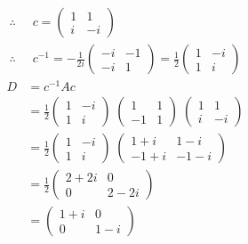 \documentclass[../main-sheet.tex]{subfiles}
\begin{document}
\begin{soln}
    \begin{align*}
        \therefore\;\;& c=\begin{pmatrix}
            1 & 1\\
            i & -i
        \end{pmatrix}\\
        \therefore\;\;& c^{-1}=-\frac{1}{2i}\begin{pmatrix}
            -i & -1\\
            -i & 1
        \end{pmatrix}=\frac{1}{2}\begin{pmatrix}
            1 & -i\\
            1 & i
        \end{pmatrix}
    \end{align*}
    \begin{align*}
        D&=c^{-1}Ac\\
        &=\frac{1}{2}\begin{pmatrix}
            1 & -i\\
            1 & i
        \end{pmatrix}\;\begin{pmatrix}
            1 & 1\\
            -1 & 1
        \end{pmatrix}\;\begin{pmatrix}
            1 & 1\\
            i & -i
        \end{pmatrix}\\
        &=\frac{1}{2}\begin{pmatrix}
            1 & -i\\
            1 & i
        \end{pmatrix}\;\begin{pmatrix}
            1+i & 1-i\\
            -1+i & -1-i
        \end{pmatrix}\\
        &=\frac{1}{2}\begin{pmatrix}
            2+2i & 0\\
            0 & 2-2i
        \end{pmatrix}\\
        &=\begin{pmatrix}
            1+i & 0\\
            0 & 1-i
        \end{pmatrix}
    \end{align*}

\end{soln}
\end{document}
